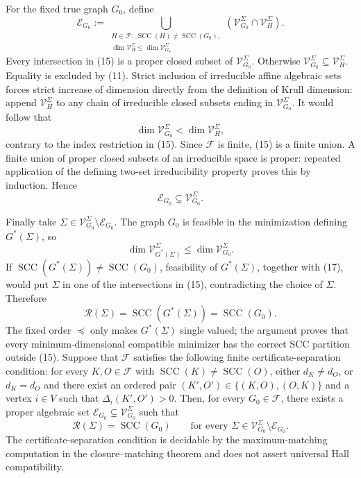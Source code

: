 For the fixed true graph \(G_0\), define
\[
\mathcal E_{G_0}:=
\bigcup_{\substack{H\in\mathcal F:\
\operatorname{SCC}(H)\ne\operatorname{SCC}(G_0),\\
\dim\mathcal V_H^\Sigma\le\dim\mathcal V_{G_0}^\Sigma}}
\left(\mathcal V_{G_0}^\Sigma\cap\mathcal V_H^\Sigma\right).
\tag{15}
\]
Every intersection in (15) is a proper closed subset of \(\mathcal V_{G_0}^\Sigma\).  Otherwise \(\mathcal V_{G_0}^\Sigma\subseteq\mathcal V_H^\Sigma\).  Equality is excluded by (11).  Strict inclusion of irreducible affine algebraic sets forces strict increase of dimension directly from the definition of Krull dimension: append \(\mathcal V_H^\Sigma\) to any chain of irreducible closed subsets ending in \(\mathcal V_{G_0}^\Sigma\).  It would follow that
\[
\dim\mathcal V_{G_0}^\Sigma<\dim\mathcal V_H^\Sigma,
\]
contrary to the index restriction in (15).  Since \(\mathcal F\) is finite, (15) is a finite union.  A finite union of proper closed subsets of an irreducible space is proper: repeated application of the defining two-set irreducibility property proves this by induction.  Hence
\[
\mathcal E_{G_0}\subsetneq\mathcal V_{G_0}^\Sigma.
\tag{16}
\]

Finally take \(\Sigma\in\mathcal V_{G_0}^\Sigma\setminus\mathcal E_{G_0}\).  The graph \(G_0\) is feasible in the minimization defining \(G^*(\Sigma)\), so
\[
\dim\mathcal V_{G^*(\Sigma)}^\Sigma
\le \dim\mathcal V_{G_0}^\Sigma.
\tag{17}
\]
If \(\operatorname{SCC}(G^*(\Sigma))\ne\operatorname{SCC}(G_0)\), feasibility of \(G^*(\Sigma)\), together with (17), would put \(\Sigma\) in one of the intersections in (15), contradicting the choice of \(\Sigma\).  Therefore
\[
\mathcal R(\Sigma)
=\operatorname{SCC}(G^*(\Sigma))
=\operatorname{SCC}(G_0).
\]
The fixed order \(\preceq\) only makes \(G^*(\Sigma)\) single valued; the argument proves that every minimum-dimensional compatible minimizer has the correct SCC partition outside (15).
Suppose that \(\mathcal F\) satisfies the following finite certificate-separation condition: for every \(K,O\in\mathcal F\) with \(\operatorname{SCC}(K)\ne\operatorname{SCC}(O)\), either \(d_K\ne d_O\), or \(d_K=d_O\) and there exist an ordered pair \((K',O')\in\{(K,O),(O,K)\}\) and a vertex \(i\in V\) such that \(\Delta_i(K',O')>0\).  Then, for every \(G_0\in\mathcal F\), there exists a proper algebraic set \(\mathcal E_{G_0}\subsetneq\mathcal V_{G_0}^\Sigma\) such that
\[
\mathcal R(\Sigma)=\operatorname{SCC}(G_0)
\qquad\text{for every }\Sigma\in\mathcal V_{G_0}^\Sigma\setminus\mathcal E_{G_0}.
\]
The certificate-separation condition is decidable by the maximum-matching computation in the closure--matching theorem and does not assert universal Hall compatibility.
